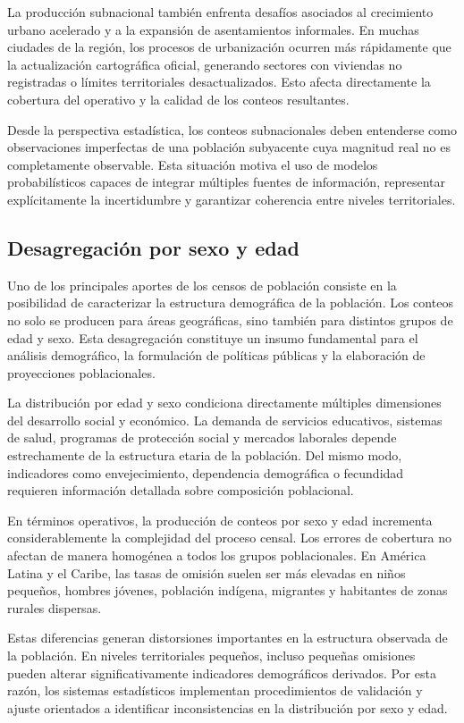 \documentclass[
  spanish,
]{book}
\begin{document}
La producción subnacional también enfrenta desafíos asociados al crecimiento urbano acelerado y a la expansión de asentamientos informales. En muchas ciudades de la región, los procesos de urbanización ocurren más rápidamente que la actualización cartográfica oficial, generando sectores con viviendas no registradas o límites territoriales desactualizados. Esto afecta directamente la cobertura del operativo y la calidad de los conteos resultantes.

Desde la perspectiva estadística, los conteos subnacionales deben entenderse como observaciones imperfectas de una población subyacente cuya magnitud real no es completamente observable. Esta situación motiva el uso de modelos probabilísticos capaces de integrar múltiples fuentes de información, representar explícitamente la incertidumbre y garantizar coherencia entre niveles territoriales.

\subsection{Desagregación por sexo y edad}\label{desagregaciuxf3n-por-sexo-y-edad}

Uno de los principales aportes de los censos de población consiste en la posibilidad de caracterizar la estructura demográfica de la población. Los conteos no solo se producen para áreas geográficas, sino también para distintos grupos de edad y sexo. Esta desagregación constituye un insumo fundamental para el análisis demográfico, la formulación de políticas públicas y la elaboración de proyecciones poblacionales.

La distribución por edad y sexo condiciona directamente múltiples dimensiones del desarrollo social y económico. La demanda de servicios educativos, sistemas de salud, programas de protección social y mercados laborales depende estrechamente de la estructura etaria de la población. Del mismo modo, indicadores como envejecimiento, dependencia demográfica o fecundidad requieren información detallada sobre composición poblacional.

En términos operativos, la producción de conteos por sexo y edad incrementa considerablemente la complejidad del proceso censal. Los errores de cobertura no afectan de manera homogénea a todos los grupos poblacionales. En América Latina y el Caribe, las tasas de omisión suelen ser más elevadas en niños pequeños, hombres jóvenes, población indígena, migrantes y habitantes de zonas rurales dispersas.

Estas diferencias generan distorsiones importantes en la estructura observada de la población. En niveles territoriales pequeños, incluso pequeñas omisiones pueden alterar significativamente indicadores demográficos derivados. Por esta razón, los sistemas estadísticos implementan procedimientos de validación y ajuste orientados a identificar inconsistencias en la distribución por sexo y edad.
\end{document}
